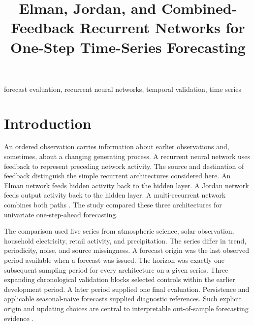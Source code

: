 \documentclass[conference,10pt]{IEEEtran}
\begin{document}
\title{Elman, Jordan, and Combined-Feedback Recurrent Networks for One-Step Time-Series Forecasting}
\author{
}
\maketitle

\begin{abstract}

\end{abstract}

\begin{IEEEkeywords}
forecast evaluation, recurrent neural networks, temporal validation, time series
\end{IEEEkeywords}

\section{Introduction}
An ordered observation carries information about earlier observations and, sometimes, about a changing generating process. A recurrent neural network uses feedback to represent preceding network activity. The source and destination of feedback distinguish the simple recurrent architectures considered here. An Elman network feeds hidden activity back to the hidden layer. A Jordan network feeds output activity back to the hidden layer. A multi-recurrent network combines both paths \cite{engelbrecht2007computational,abdulkarim2019recurrent}. The study compared these three architectures for univariate one-step-ahead forecasting.

The comparison used five series from atmospheric science, solar observation, household electricity, retail activity, and precipitation. The series differ in trend, periodicity, noise, and source missingness. A forecast origin was the last observed period available when a forecast was issued. The horizon was exactly one subsequent sampling period for every architecture on a given series. Three expanding chronological validation blocks selected controls within the earlier development period. A later period supplied one final evaluation. Persistence and applicable seasonal-naive forecasts supplied diagnostic references. Such explicit origin and updating choices are central to interpretable out-of-sample forecasting evidence \cite{tashman2000outofsample,hewamalage2023evaluation}.
\end{document}

